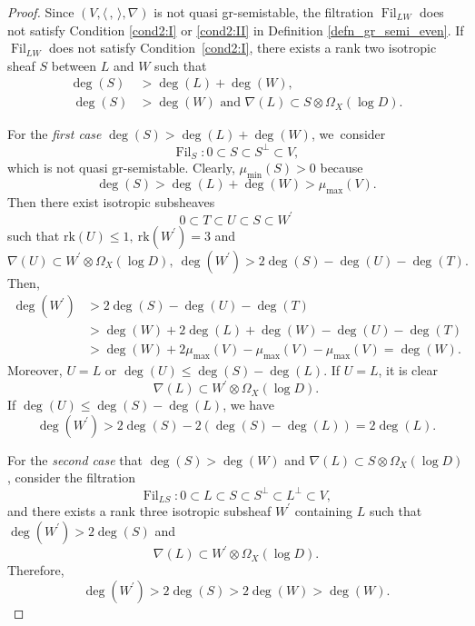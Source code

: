\documentclass[JEP,XML,SOM,Unicode,published]{cedram}
\newcommand{\grsemistable}{gr\nobreakdash-semi\-stable\xspace}
\DeclareMathOperator{\Filt}{Fil}
\newcommand{\rk}{\mathrm{rk}}
\theoremstyle{plain}
\theoremstyle{definition}
\begin{document}
\begin{proof}
Since $(V,\langle \,, \, \rangle,\nabla)$ is not quasi \grsemistable, the filtration $\Filt_{LW}$ does not satisfy Condition \eqref{cond2:I} or \eqref{cond2:II} in Definition \ref{defn_gr_semi_even}. If $\Filt_{LW}$ does not satisfy Condition~\eqref{cond2:I}, there exists a rank two isotropic sheaf $S$ between $L$ and $W$ such that
\begin{align*}
\deg(S)&>\deg(L)+\deg(W),
\\\
\tag*{or}
\deg(S)&>\deg(W) \text{ and } \nabla(L)\subset S\otimes\Omega_X(\log D).
\end{align*}

For the \emph{first case} $\deg(S)>\deg(L)+\deg(W)$, we~consider
\[
\Filt_S:0\subset S\subset S^\perp\subset V,
\]
which is not quasi \grsemistable. Clearly, $\mu_{\min}(S)>0 $ because
\[
\deg(S)>\deg(L)+\deg(W)>\mu_{\max}(V).
\]
Then there exist isotropic subsheaves
\[
0\subset T\subset U\subset S\subset W^\prime 
\]
such that $\rk(U)\leq1,\ \rk(W^\prime)=3$ and
\[
\nabla(U )\subset W^\prime\otimes\Omega_X(\log D),\ \deg(W^\prime)>2\deg(S)-\deg(U)-\deg(T).
\]
Then,
\begin{equation*}
\begin{split}
\deg(W^\prime)&> 2\deg(S)-\deg(U)-\deg(T)\\
&>\deg(W)+2\deg(L)+\deg(W)-\deg(U)-\deg(T)\\
&>\deg(W)+2\mu_{\max}(V)-\mu_{\max}(V)-\mu_{\max}(V)=\deg(W).
\end{split}
\end{equation*}
Moreover, $U=L$ or $\deg(U)\leq \deg(S)-\deg(L)$. If $U=L$, it is clear
\[
\nabla(L)\subset W^\prime\otimes\Omega_X(\log D).
\]
If $\deg(U)\leq \deg(S)-\deg(L)$, we have
\[
\deg(W^\prime)>2\deg(S)-2(\deg(S)-\deg(L))=2\deg(L).
\]

For the \emph{second case} that $\deg(S)>\deg(W)$ and $\nabla(L)\subset S\otimes\Omega_X(\log D)$, consider the filtration
\[
\Filt_{LS}:0\subset L\subset S\subset S^\perp\subset L^\perp\subset V,
\]
and there exists a rank three isotropic subsheaf $W^\prime$ containing $L$ such that $\deg(W^\prime)>2\deg(S)$ and
\[
\nabla(L)\subset W^\prime\otimes\Omega_X(\log D).
\]
Therefore,
\[
\deg(W^\prime)>2\deg(S)>2\deg(W)>\deg(W).
\]


\end{proof}
\end{document}
